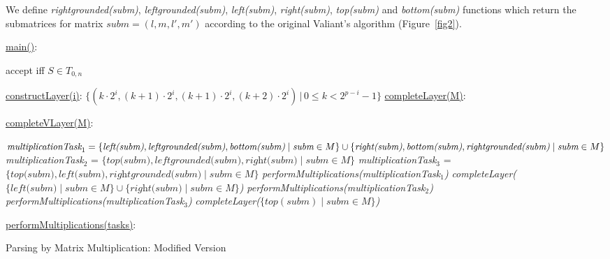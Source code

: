 We define \textit{rightgrounded(subm)}, \textit{leftgrounded(subm)}, \textit{left(subm)}, \textit{right(subm)}, \textit{top(subm)} and \textit{bottom(subm)} functions which return the submatrices for matrix $\textit{subm} = (l, m, l', m')$ according to the original Valiant's algorithm (Figure~\ref{fig2}).

\begin{algorithm}[h]
\SetAlgoNoLine
{}
\underline{main()}{:}{

 accept iff $S \in T_{0, n}$
 \BlankLine
 }

\underline{constructLayer(i)}{:}{
 \BlankLine
 $\{(k\cdot2^i, (k+1)\cdot2^i, (k + 1)\cdot2^i, (k+2)\cdot2^i) \, |\, 0 \le k < 2^{p - i} - 1\}$
 \BlankLine
    }
\underline{completeLayer(M)}{:}{
\BlankLine
{}
\BlankLine
}

\underline{completeVLayer(M)}{:}{
 \BlankLine
 $\textit{multiplicationTask}_1 = \linebreak
    \{\textit{left(subm)}, \textit{leftgrounded(subm)}, \textit{bottom(subm)} \mid \textit{subm} \in M \} \cup \linebreak  \{\textit{right(subm)}, \textit{bottom(subm)}, \textit{rightgrounded(subm)} \mid \textit{subm} \in M\}$\;
 \BlankLine
 \textit{multiplicationTask$_2$} = $\{\textit{top(subm)}, \textit{leftgrounded(subm)}, \textit{right(subm)} \mid \textit{subm} \in M\}$\;
 \BlankLine
 \textit{multiplicationTask$_3$} = $\{\textit{top(subm)}, \textit{left(subm)}, \textit{rightgrounded(subm)} \mid \textit{subm} \in M\}$\;
 \BlankLine
 \textit{performMultiplications(multiplicationTask$_1$)}\;
 \textit{completeLayer($\{\textit{left(subm)} \mid subm \in M \} \cup \{\textit{right(subm)} \mid \textit{subm} \in M \}$)}\;
 \textit{performMultiplications(multiplicationTask$_2$)}\;
 \textit{performMultiplications(multiplicationTask$_3$)}\;
 \textit{completeLayer($\{top(subm) \mid subm \in M \}$)}

 }
 \BlankLine

 \underline{performMultiplications(tasks)}{:}{\\
 }

\caption{Parsing by Matrix Multiplication: Modified Version}
\label{algo:modified}
\end{algorithm}

